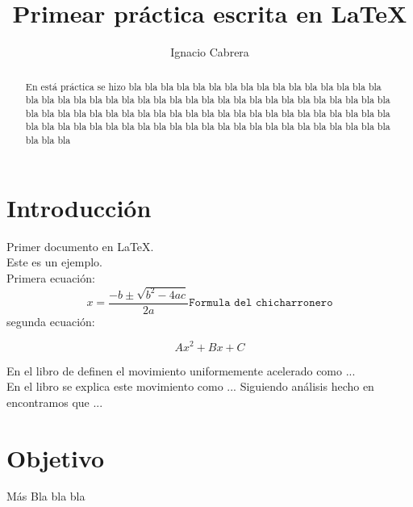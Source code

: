 \documentclass[12pt,letterpaper]{article}
\begin{document}
\renewcommand{\refname}{Bibliografía}


\author{Ignacio Cabrera}
\title{Primear práctica escrita en \LaTeX}



\maketitle
\begin{abstract}


En está práctica se hizo bla bla bla bla bla bla bla bla bla bla bla bla bla bla bla bla bla bla bla bla bla bla bla bla bla bla bla bla bla bla bla bla bla bla bla bla bla bla bla bla bla bla bla bla bla bla bla bla bla bla bla bla bla bla bla bla bla bla bla bla bla bla bla bla bla bla bla bla bla bla bla bla bla bla bla bla bla bla bla bla bla bla bla bla bla bla bla bla
\end{abstract}



\section{Introducción}
\label{sec1}


Primer documento en  \LaTeX . \\
Este es un ejemplo.\\
Primera ecuación:
\begin{equation}
x= \dfrac{-b \pm \sqrt{b^{2}-4ac}}{2a} \texttt{Formula del chicharronero}
\end{equation}
segunda ecuación:

\begin{equation}
Ax^{2}+ Bx + C
\end{equation}

En el libro de \cite{2003fpp2.book.....H} definen el movimiento uniformemente acelerado como ...
 \\
 

En el libro \cite{1968fup..book.....A} se explica este movimiento como ... Siguiendo análisis hecho en \cite{1970AmJPh..38..781T} encontramos que ...

\section{Objetivo}
Más Bla bla bla
\end{document}
